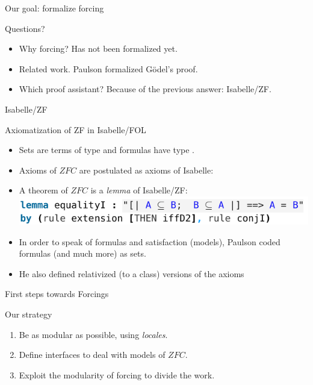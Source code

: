 \documentclass{beamer}
\begin{document}
\begin{frame}{Our goal: formalize forcing}
  \begin{block}{Questions?}
    \begin{itemize}
    \item Why forcing? Has not been formalized yet. %
    \item Related work. Paulson formalized Gödel's proof. %
    \item Which proof assistant? Because of the previous answer:
      Isabelle/ZF.
    \end{itemize}
  \end{block}
\end{frame}

\begin{frame}{Isabelle/ZF}
  \begin{block}{Axiomatization of ZF in Isabelle/FOL}
    \begin{itemize}
    \item Sets are terms of type  and formulas have type
      . %
    \item Axioms of $ZFC$ are postulated as axioms of Isabelle:
    \item A theorem of $ZFC$ is a \emph{lemma} of Isabelle/ZF:
           \includegraphics[scale=1.3]{eqI.png}
     \item In order to speak of formulas and satisfaction
           (models), Paulson coded formulas (and much more) as sets.
         \item He also defined relativized (to a class) versions of the axioms\\
\hspace{-0.5cm}   
     \end{itemize}
\end{block}
\end{frame}

\begin{frame}{First steps towards Forcings}
  \begin{block}{Our strategy}
    \begin{enumerate}
    \item Be as modular as possible, using \emph{locales}.
    \item Define interfaces to deal with models of $ZFC$.
    \item Exploit the modularity of forcing to divide the work.
    \end{enumerate}
  \end{block}
\end{frame}
\end{document}
